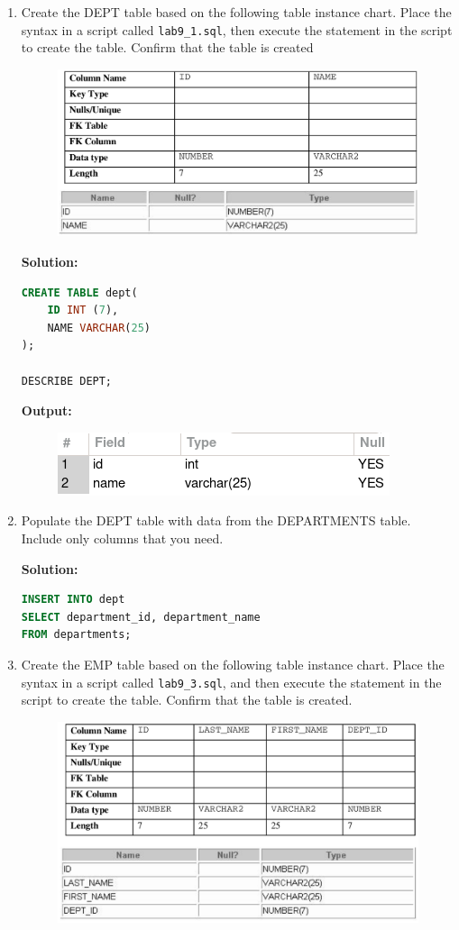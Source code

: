 
\begin{enumerate}

    \item Create the DEPT table based on the following table instance chart. Place the
syntax in a script called \texttt{lab9\_1.sql}, then execute the statement in the script to create the table.
Confirm that the table is created
    \begin{figure}[h]
    \centering
        \centering
        \includegraphics[width=.7\linewidth]{graphics/91.png}
    \end{figure}

    \textbf{Solution: }
    \begin{lstlisting}[language=SQL]
CREATE TABLE dept(
    ID INT (7),
    NAME VARCHAR(25)
);

DESCRIBE DEPT;
    \end{lstlisting}
    \textbf{Output: }
    \begin{figure}[h]
        \centering
        \includegraphics[width=0.5\linewidth]{graphics/p91.png}
    \end{figure}
    \item Populate the DEPT table with data from the DEPARTMENTS table. Include only columns that
you need.

    \textbf{Solution: }
    \begin{lstlisting}[language=SQL]
INSERT INTO dept
SELECT department_id, department_name
FROM departments;
    \end{lstlisting}

    \item Create the EMP table based on the following table instance chart. Place the syntax in a script called
\texttt{lab9\_3.sql}, and then execute the statement in the script to create the table. Confirm that the table is
created.
    \begin{figure}[h]
    \centering
        \centering
        \includegraphics[width=.7\linewidth]{graphics/93.png}
    \end{figure}


\end{enumerate}
